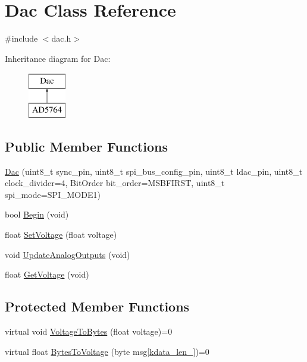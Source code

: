 \hypertarget{classDac}{}\section{Dac Class Reference}
\label{classDac}


{\ttfamily \#include $<$dac.\+h$>$}

Inheritance diagram for Dac\+:\begin{figure}[H]
\begin{center}
\leavevmode
\includegraphics[height=2.000000cm]{classDac}
\end{center}
\end{figure}
\subsection*{Public Member Functions}
\begin{DoxyCompactItemize}
\item 
\mbox{\hyperlink{classDac_ae74afbc4c82a8acbd8c74dcf4ea046ba}{Dac}} (uint8\+\_\+t sync\+\_\+pin, uint8\+\_\+t spi\+\_\+bus\+\_\+config\+\_\+pin, uint8\+\_\+t ldac\+\_\+pin, uint8\+\_\+t clock\+\_\+divider=4, Bit\+Order bit\+\_\+order=M\+S\+B\+F\+I\+R\+ST, uint8\+\_\+t spi\+\_\+mode=S\+P\+I\+\_\+\+M\+O\+D\+E1)
\item 
bool \mbox{\hyperlink{classDac_ad88e0048e59c0633b72769ddb8337e49}{Begin}} (void)
\item 
float \mbox{\hyperlink{classDac_a71ede236baa8fc67d18db38629e6c225}{Set\+Voltage}} (float voltage)
\item 
void \mbox{\hyperlink{classDac_aafef1707ec33a2166a69e9b646cd471b}{Update\+Analog\+Outputs}} (void)
\item 
float \mbox{\hyperlink{classDac_afad6313ba5c58c10efde3849c7f89d2e}{Get\+Voltage}} (void)
\end{DoxyCompactItemize}
\subsection*{Protected Member Functions}
\begin{DoxyCompactItemize}
\item 
virtual void \mbox{\hyperlink{classDac_ac21022b2b921437418004af9ae7de8ae}{Voltage\+To\+Bytes}} (float voltage)=0
\item 
virtual float \mbox{\hyperlink{classDac_a1dc9be97cb41ddacbd8dde0c5d4243b4}{Bytes\+To\+Voltage}} (byte msg\mbox{[}\mbox{\hyperlink{classDac_af3de0bf669183e66ebf916f8c685fe6b}{kdata\+\_\+len\+\_\+}}\mbox{]})=0
\end{DoxyCompactItemize}
